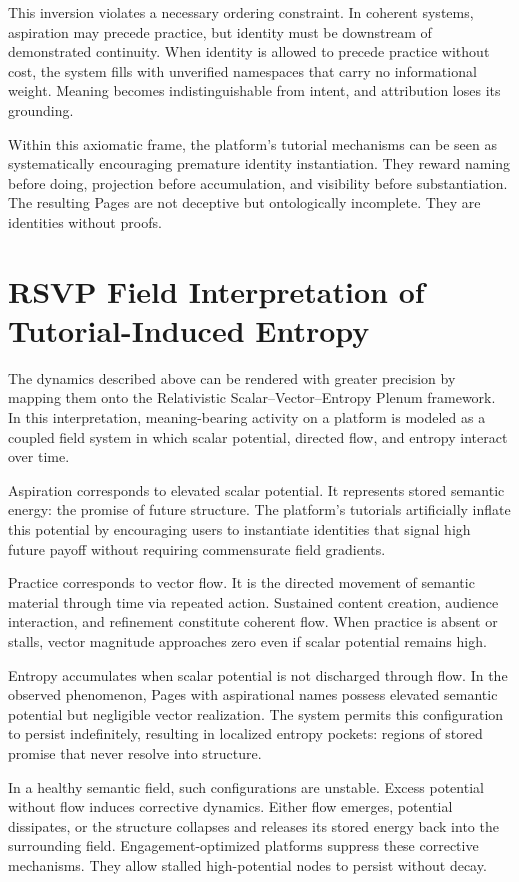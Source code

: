 \documentclass[11pt,oneside]{article}
\begin{document}
This inversion violates a necessary ordering constraint. In coherent systems, aspiration may precede practice, but identity must be downstream of demonstrated continuity. When identity is allowed to precede practice without cost, the system fills with unverified namespaces that carry no informational weight. Meaning becomes indistinguishable from intent, and attribution loses its grounding.

Within this axiomatic frame, the platform’s tutorial mechanisms can be seen as systematically encouraging premature identity instantiation. They reward naming before doing, projection before accumulation, and visibility before substantiation. The resulting Pages are not deceptive but ontologically incomplete. They are identities without proofs.

\section{RSVP Field Interpretation of Tutorial-Induced Entropy}

The dynamics described above can be rendered with greater precision by mapping them onto the Relativistic Scalar--Vector--Entropy Plenum framework. In this interpretation, meaning-bearing activity on a platform is modeled as a coupled field system in which scalar potential, directed flow, and entropy interact over time.

Aspiration corresponds to elevated scalar potential. It represents stored semantic energy: the promise of future structure. The platform’s tutorials artificially inflate this potential by encouraging users to instantiate identities that signal high future payoff without requiring commensurate field gradients.

Practice corresponds to vector flow. It is the directed movement of semantic material through time via repeated action. Sustained content creation, audience interaction, and refinement constitute coherent flow. When practice is absent or stalls, vector magnitude approaches zero even if scalar potential remains high.

Entropy accumulates when scalar potential is not discharged through flow. In the observed phenomenon, Pages with aspirational names possess elevated semantic potential but negligible vector realization. The system permits this configuration to persist indefinitely, resulting in localized entropy pockets: regions of stored promise that never resolve into structure.

In a healthy semantic field, such configurations are unstable. Excess potential without flow induces corrective dynamics. Either flow emerges, potential dissipates, or the structure collapses and releases its stored energy back into the surrounding field. Engagement-optimized platforms suppress these corrective mechanisms. They allow stalled high-potential nodes to persist without decay.
\end{document}

